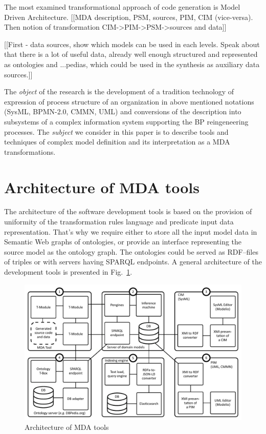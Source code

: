 \documentclass[conference]{IEEEtran}
\begin{document}
The most examined transformational approach of code generation is Model Driven Architecture.
[[MDA description, PSM, sources, PIM, CIM (vice-versa). Then notion of transformation CIM->PIM->PSM->sources and data]]

[[First - data sources, show which models can be used in each levels. Speak about that there is a lot of useful data, already well enough structured and represented as ontologies and ...pedias, which could be used in the synthesis as auxiliary data sources.]]

The \emph{object} of the research is the development of a tradition technology \cite{} of expression of process structure of an organization in above mentioned notations (SysML, BPMN-2.0, CMMN, UML) and conversions of the description into subsystems of a complex information system supporting the BP reingeneering processes. The \emph{subject} we consider in this paper is to describe tools and techniques of complex model definition and its interpretation as a MDA transformations.

\section{Architecture of MDA tools}


The architecture of the software development tools is based on the provision of uniformity of the transformation rules language and predicate input data representation.  That's why we require either to store all the input model data in Semantic Web graphs of ontologies, or provide an interface representing the source model as the ontology graph.  The ontologies could be served as RDF--files of triples or with servers having SPARQL endpoints.  A general architecture of the development tools is presented in Fig.~\ref{fig:archi}.

\begin{figure}[htb]
  \centering
   \includegraphics[width=1\linewidth]{pics/architecture-mda-lod-ext.pdf}
  \caption{Architecture of MDA tools}
  \label{fig:archi}
\end{figure}
\end{document}
